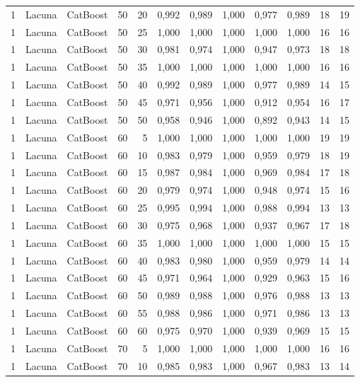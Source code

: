 \begin{longtable}{@{}rllrrrrrrrrr@{}}
1 & Lacuna & CatBoost & 50 & 20 & 0,992 & 0,989 & 1,000 & 0,977 & 0,989 & 18 & 19 \\
1 & Lacuna & CatBoost & 50 & 25 & 1,000 & 1,000 & 1,000 & 1,000 & 1,000 & 16 & 16 \\
1 & Lacuna & CatBoost & 50 & 30 & 0,981 & 0,974 & 1,000 & 0,947 & 0,973 & 18 & 18 \\
1 & Lacuna & CatBoost & 50 & 35 & 1,000 & 1,000 & 1,000 & 1,000 & 1,000 & 16 & 16 \\
1 & Lacuna & CatBoost & 50 & 40 & 0,992 & 0,989 & 1,000 & 0,977 & 0,989 & 14 & 15 \\
1 & Lacuna & CatBoost & 50 & 45 & 0,971 & 0,956 & 1,000 & 0,912 & 0,954 & 16 & 17 \\
1 & Lacuna & CatBoost & 50 & 50 & 0,958 & 0,946 & 1,000 & 0,892 & 0,943 & 14 & 15 \\
1 & Lacuna & CatBoost & 60 & 5 & 1,000 & 1,000 & 1,000 & 1,000 & 1,000 & 19 & 19 \\
1 & Lacuna & CatBoost & 60 & 10 & 0,983 & 0,979 & 1,000 & 0,959 & 0,979 & 18 & 19 \\
1 & Lacuna & CatBoost & 60 & 15 & 0,987 & 0,984 & 1,000 & 0,969 & 0,984 & 17 & 18 \\
1 & Lacuna & CatBoost & 60 & 20 & 0,979 & 0,974 & 1,000 & 0,948 & 0,974 & 15 & 16 \\
1 & Lacuna & CatBoost & 60 & 25 & 0,995 & 0,994 & 1,000 & 0,988 & 0,994 & 13 & 13 \\
1 & Lacuna & CatBoost & 60 & 30 & 0,975 & 0,968 & 1,000 & 0,937 & 0,967 & 17 & 18 \\
1 & Lacuna & CatBoost & 60 & 35 & 1,000 & 1,000 & 1,000 & 1,000 & 1,000 & 15 & 15 \\
1 & Lacuna & CatBoost & 60 & 40 & 0,983 & 0,980 & 1,000 & 0,959 & 0,979 & 14 & 14 \\
1 & Lacuna & CatBoost & 60 & 45 & 0,971 & 0,964 & 1,000 & 0,929 & 0,963 & 15 & 16 \\
1 & Lacuna & CatBoost & 60 & 50 & 0,989 & 0,988 & 1,000 & 0,976 & 0,988 & 13 & 13 \\
1 & Lacuna & CatBoost & 60 & 55 & 0,988 & 0,986 & 1,000 & 0,971 & 0,986 & 13 & 13 \\
1 & Lacuna & CatBoost & 60 & 60 & 0,975 & 0,970 & 1,000 & 0,939 & 0,969 & 15 & 15 \\
1 & Lacuna & CatBoost & 70 & 5 & 1,000 & 1,000 & 1,000 & 1,000 & 1,000 & 16 & 16 \\
1 & Lacuna & CatBoost & 70 & 10 & 0,985 & 0,983 & 1,000 & 0,967 & 0,983 & 13 & 14 \\

\end{longtable}
